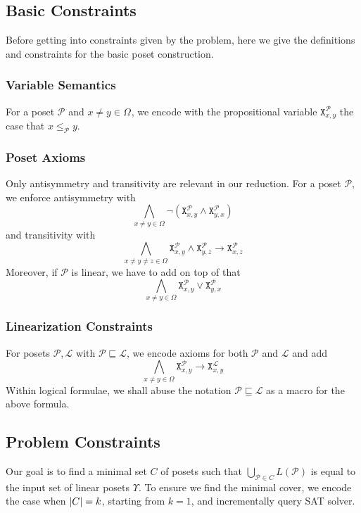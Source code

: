 \documentclass[12pt]{llncs}
\DeclarePairedDelimiter{\abs}{\lvert}{\rvert}
\let\oldleq\leq
\renewcommand{\leq}[1][]{\oldleq_{#1}}
\renewcommand{\implies}{\rightarrow}
\newcommand{\poset}[1]{\mathcal{#1}}
\newcommand{\uni}[1][]{\Omega_{#1}}
\newcommand{\lang}[1]{L(#1)}
\newcommand{\lext}{\sqsubseteq}
\newcommand{\satvar}[2]{\mathtt{X}_{#1}^{#2}}
\begin{document}
\subsection{Basic Constraints}
Before getting into constraints given by the problem, here we give the definitions and constraints for the basic poset construction.

\subsubsection{Variable Semantics}
For a poset $\poset{P}$ and $x \!\neq\! y \!\in\! \uni$, we encode with the propositional variable $\satvar{x,y}{\poset{P}}$ the case that $x \leq[\poset{P}] y$.

\subsubsection{Poset Axioms}
Only antisymmetry and transitivity are relevant in our reduction. For a poset $\poset{P}$, we enforce antisymmetry with
\[
\bigwedge_{x \neq y \in \uni} \neg (\satvar{x,y}{\poset{P}} \wedge \satvar{y,x}{\poset{P}})
\]
and transitivity with
\[
\bigwedge_{x \neq y \neq z \in \uni}
\satvar{x,y}{\poset{P}} \wedge \satvar{y,z}{\poset{P}} \implies \satvar{x,z}{\poset{P}}
\]
Moreover, if $\poset{P}$ is linear, we have to add on top of that
\[
\bigwedge_{x \neq y \in \uni} \satvar{x,y}{\poset{P}} \vee \satvar{y,x}{\poset{P}}
\]

\subsubsection{Linearization Constraints}
For posets $\poset{P},\poset{L}$ with $\poset{P} \lext \poset{L}$, we encode axioms for both $\poset{P}$ and $\poset{L}$ and add
\[
\bigwedge_{x \neq y \in \uni} \satvar{x,y}{\poset{P}} \implies \satvar{x,y}{\poset{L}}
\]
Within logical formulae, we shall abuse the notation $\poset{P} \lext \poset{L}$ as a macro for the above formula.
\label{subsubsec:linear}

\subsection{Problem Constraints}
Our goal is to find a minimal set $C$ of posets such that $\bigcup_{\poset{P} \in C} \lang{\poset{P}}$ is equal to the input set of linear posets $\Upsilon$. To ensure we find the minimal cover, we encode the case when $\abs{C} = k$, starting from $k = 1$, and incrementally query SAT solver.
\end{document}

